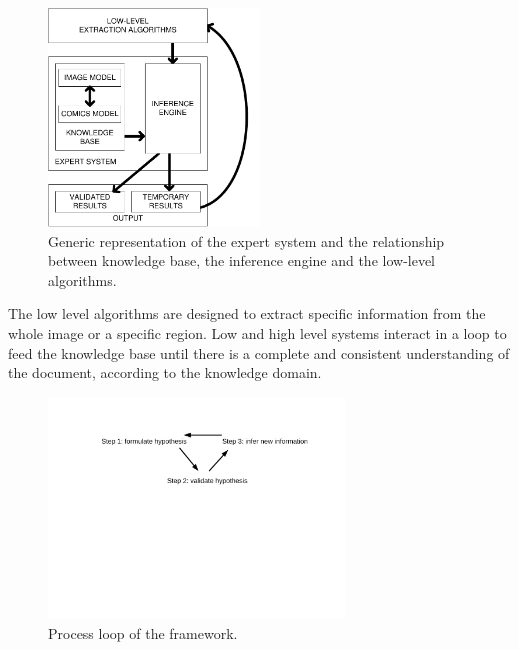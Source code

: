  \begin{figure}[!ht]  %
   \centering
  \includegraphics[trim= 0px 0px 0px 0px, clip, width=0.5\textwidth]{expert_system.pdf}
  \caption[Generic representation of the expert system and the relationship between knowledge base, the inference engine and the low-level algorithms]{Generic representation of the expert system and the relationship between knowledge base, the inference engine and the low-level algorithms.}
  \label{fig:kn:generic_expert_system}
 \end{figure}


The low level algorithms are designed to extract specific information from the whole image or a specific region.
Low and high level systems interact in a loop to feed the knowledge base until there is a complete and consistent understanding of the document, according to the knowledge domain. 


 \begin{figure}[!ht]  %
   \centering
  \includegraphics[trim= 140px 350px 100px 95px, clip, width=0.7\textwidth]{process_loop.pdf}
  \caption[Process loop of the knowledge-driven system]{Process loop of the framework.}
  \label{fig:kn:process_loop}
 \end{figure}

